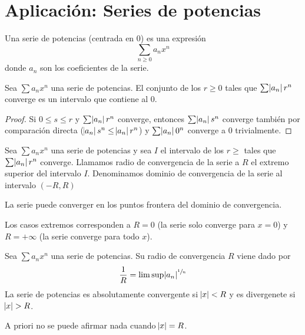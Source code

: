 \section{Aplicación: Series de potencias}

\begin{defi}
	Una serie de potencias (centrada en 0) es una expresión
	\[
		\sum_{n \geq 0} a_nx^n
	\]
	donde $a_n$ son los coeficientes de la serie.
\end{defi}

\begin{lema}
	Sea $\sum a_nx^n$ una serie de potencias. El conjunto de los $r \geq 0$ tales
	que $\sum \abs{a_n}r^n$ converge es un intervalo que contiene al 0.
\end{lema}

\begin{proof}
	Si $0 \leq s \leq r$ y $\sum \abs{a_n}r^n$ converge, entonces $\sum \abs{a_n}s^n$
	converge también por comparación directa ($\abs{a_n}s^n \leq \abs{a_n}r^n$) y
	$\sum \abs{a_n}0^n$ converge a 0 trivialmente.
\end{proof}

\begin{defi}
	Sea $\sum a_nx^n$ una serie de potencias y sea $I$ el intervalo de los $r \geq$ tales que
	$\sum \abs{a_n}r^n$ converge. Llamamos radio de convergencia de la serie a $R$ el
	extremo superior del intervalo $I$. Denominamos dominio de convergencia de la serie
	al intervalo $(-R,R)$
\end{defi}

\begin{obs*}
	La serie puede converger en los puntos frontera del dominio de convergencia.
\end{obs*}

\begin{obs*}
	Los casos extremos corresponden a $R = 0$ (la serie solo converge para $x = 0$)
	y $R = +\infty$ (la serie converge para todo $x$).
\end{obs*}

\begin{teo}
	Sea $\sum a_nx^n$ una serie de potencias. Su radio de convergencia $R$ viene dado por
	\[
		\frac{1}{R} = \limsup \abs{a_n}^{\sfrac{1}{n}}
	\]
	La serie de potencias es absolutamente convergente si $\abs{x} < R$ y es divergenete
	si $\abs{x} > R$.
\end{teo}

\begin{obs*}
	A priori no se puede afirmar nada cuando $\abs{x} = R$.
\end{obs*}


